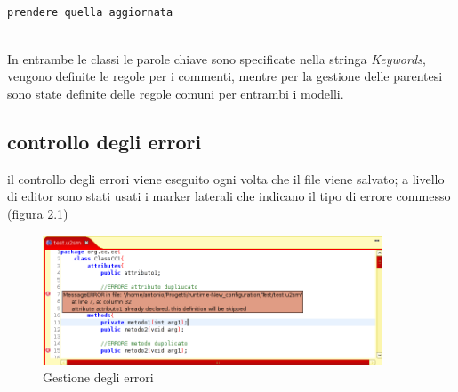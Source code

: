 \begin{lstlisting}[caption={LayoutScanner}, style={java}]

prendere quella aggiornata


\end{lstlisting}

In entrambe le classi le parole chiave sono specificate nella stringa \emph{Keywords}, 
vengono definite le regole per i commenti, mentre per la gestione delle parentesi sono state 
definite delle regole comuni per entrambi i modelli.

\subsection{controllo degli errori}
il controllo degli errori viene eseguito ogni volta che il file viene salvato; a
livello di editor sono stati usati i marker laterali che indicano il tipo di
errore commesso (figura 2.1)

\begin{figure}[htp]
\begin{center}
  \includegraphics[width=0.9\textwidth]{img/errori_editor.png}
  \caption[labelInTOC]{Gestione degli errori}
\end{center}
\end{figure}